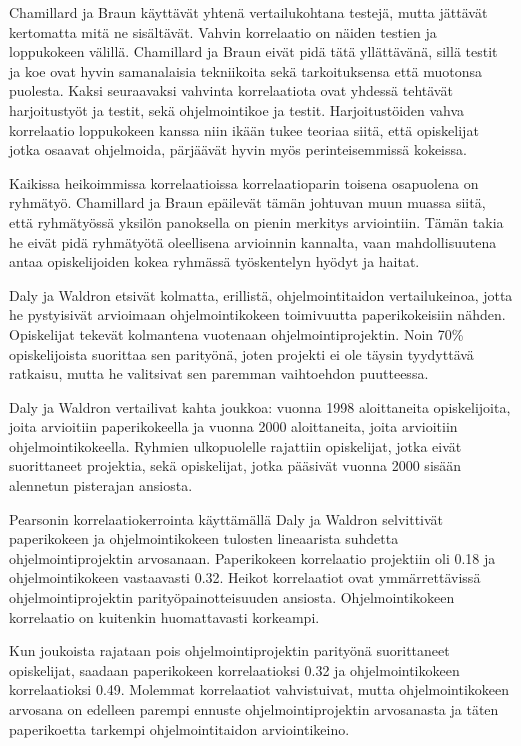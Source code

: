 \documentclass[finnish]{../tktltiki2}
\theoremstyle{definition}
\theoremstyle{remark}
\begin{document}
Chamillard ja Braun käyttävät yhtenä vertailukohtana testejä, mutta jättävät kertomatta mitä ne sisältävät. Vahvin korrelaatio on näiden testien ja loppukokeen välillä. Chamillard ja Braun eivät pidä tätä yllättävänä, sillä testit ja koe ovat hyvin samanalaisia tekniikoita sekä tarkoituksensa että muotonsa puolesta. Kaksi seuraavaksi vahvinta korrelaatiota ovat yhdessä tehtävät harjoitustyöt ja testit, sekä ohjelmointikoe ja testit. Harjoitustöiden vahva korrelaatio loppukokeen kanssa niin ikään tukee teoriaa siitä, että opiskelijat jotka osaavat ohjelmoida, pärjäävät hyvin myös perinteisemmissä kokeissa.

Kaikissa heikoimmissa korrelaatioissa korrelaatioparin toisena osapuolena on ryhmätyö. Chamillard ja Braun epäilevät tämän johtuvan muun muassa siitä, että ryhmätyössä yksilön panoksella on pienin merkitys arviointiin. Tämän takia he eivät pidä ryhmätyötä oleellisena arvioinnin kannalta, vaan mahdollisuutena antaa opiskelijoiden kokea ryhmässä työskentelyn hyödyt ja haitat.

Daly ja Waldron etsivät kolmatta, erillistä, ohjelmointitaidon vertailukeinoa, jotta he pystyisivät arvioimaan ohjelmointikokeen toimivuutta paperikokeisiin nähden. Opiskelijat tekevät kolmantena vuotenaan ohjelmointiprojektin. Noin 70\% opiskelijoista suorittaa sen parityönä, joten projekti ei ole täysin tyydyttävä ratkaisu, mutta he valitsivat sen paremman vaihtoehdon puutteessa.

Daly ja Waldron vertailivat kahta joukkoa: vuonna 1998 aloittaneita opiskelijoita, joita arvioitiin paperikokeella ja vuonna 2000 aloittaneita, joita arvioitiin ohjelmointikokeella. Ryhmien ulkopuolelle rajattiin opiskelijat, jotka eivät suorittaneet projektia, sekä opiskelijat, jotka pääsivät vuonna 2000 sisään alennetun pisterajan ansiosta.

Pearsonin korrelaatiokerrointa käyttämällä Daly ja Waldron selvittivät paperikokeen ja ohjelmointikokeen tulosten lineaarista suhdetta ohjelmointiprojektin arvosanaan. Paperikokeen korrelaatio projektiin oli 0.18 ja ohjelmointikokeen vastaavasti 0.32. Heikot korrelaatiot ovat ymmärrettävissä ohjelmointiprojektin parityöpainotteisuuden ansiosta. Ohjelmointikokeen korrelaatio on kuitenkin huomattavasti korkeampi.

Kun joukoista rajataan pois ohjelmointiprojektin parityönä suorittaneet opiskelijat, saadaan paperikokeen korrelaatioksi 0.32 ja ohjelmointikokeen korrelaatioksi 0.49. Molemmat korrelaatiot vahvistuivat, mutta ohjelmointikokeen arvosana on edelleen parempi ennuste ohjelmointiprojektin arvosanasta ja täten paperikoetta tarkempi ohjelmointitaidon arviointikeino.
\end{document}
